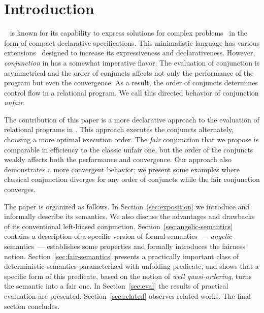 \section{Introduction}
\label{sec:intro}

\mk~\cite{fair:TheReasonedSchemer,fair:micro} is known for its capability to express solutions for complex problems~\cite{fair:seven,fair:quines,fair:theorem-prover}
in the form of compact declarative specifications. This minimalistic language has various extensions~\cite{fair:CKanren,fair:WillThesis,fair:alphaKanren,fair:Guided}
designed to increase its expressiveness and declarativeness. However, \emph{conjunction} in \mk has a somewhat imperative flavor. The evaluation of conjunction is asymmetrical
and the order of conjuncts affects not only the performance of the program but even the convergence. As a result, the order of conjuncts determines control flow in
a relational program. We call this directed behavior of conjunction \textit{unfair}.

The contribution of this paper is a more declarative approach to the evaluation of relational programs in \mk. This approach executes the conjuncts alternately, choosing
a more optimal execution order. The \emph{fair} conjunction that we propose is comparable in efficiency to the classic unfair one, but the order of the conjuncts weakly
affects both the performance and convergence. Our approach also demonstrates a more convergent behavior: we present some examples where classical conjunction diverges for
any order of conjuncts while the fair conjunction converges.

The paper is organized as follows. In Section~\ref{sec:exposition} we introduce \mk and informally describe its semantics. We also discuss the advantages and drawbacks of its
conventional left-biased  conjunction. Section~\ref{sec:angelic-semantics} contains a description of a specific version of \mk formal semantics~--- \emph{angelic} semantics~---
establishes some properties and formally introduces the fairness notion. Section~\ref{sec:fair-semantics} presents a practically important class of deterministic semantics
parameterized with unfolding predicate, and shows that a specific form of this predicate, based on the notion of \emph{well quasi-ordering}, turns the semantic into a fair one.
In Section~\ref{sec:eval} the results of practical evaluation are presented. Section~\ref{sec:related} observes related works. The final section concludes.
